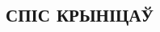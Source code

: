 \patchcmd{\thebibliography}{\chapter*}{\section*}{}{}

\begin{center}
    \section*{СПІС КРЫНІЦАЎ}

\end{center}\renewcommand*\bibname{}




\newpage
